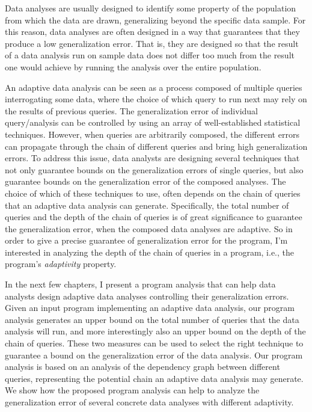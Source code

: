 
Data analyses are usually designed to identify some property of the population 
from which the data are drawn, generalizing beyond the specific data sample. 
For this reason, data analyses are often designed in a way that guarantees that they produce a low generalization error.
That is, they are designed so that the result of a data analysis run on sample data does not differ too much from the result one would achieve by running the analysis over the entire population. 

An adaptive data analysis can be seen as a process composed of multiple queries interrogating some data, where the choice of which query to run next may rely on the results of previous queries. 
The generalization error of individual query/analysis can be controlled by using an array of well-established statistical techniques.
However, when queries are arbitrarily composed, the different errors can propagate through the chain of different queries and bring high generalization errors. 
To address this issue, data analysts are designing several techniques that not only guarantee bounds on the generalization errors of single queries, but also guarantee bounds on the generalization error of the composed analyses. 
The choice of which of these techniques to use, 
often depends on the chain of queries that an adaptive data analysis can generate.
Specifically, the total number of queries and the depth of the chain of queries is of great significance 
to guarantee the generalization error, 
when the composed data analyses are adaptive. 
So in order to give a precise guarantee of generalization error
for the program,
I'm interested in analyzing the depth of the chain of queries in a program, i.e., the program's \emph{adaptivity} property.

In the next few chapters, I present a program analysis that can help data analysts design adaptive data analyses controlling their generalization errors.
Given an input program implementing an adaptive data analysis, 
our program analysis generates an upper bound on the total number of queries that the data analysis will run, and more interestingly also an upper bound on the depth of the chain of queries.
These two measures can be used to select the right technique to guarantee a bound on the generalization error of the data analysis.
Our program analysis is based on an analysis of the dependency graph between different queries, representing the potential chain an adaptive data analysis may generate.
We show how the proposed program analysis can help to analyze the generalization error of several concrete data analyses with different adaptivity.